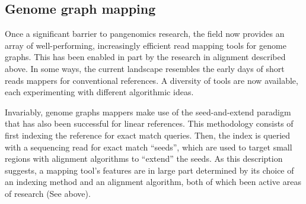 \subsection{Genome graph mapping}
Once a significant barrier to pangenomics research, the field now provides an array of well-performing, increasingly efficient read mapping tools for genome graphs.
This has been enabled in part by the research in alignment described above.
In some ways, the current landscape resembles the early days of short reads mappers for conventional references. 
A diversity of tools are now available, each experimenting with different algorithmic ideas. 


Invariably, genome graphs mappers make use of the seed-and-extend paradigm that has also been successful for linear references.
This methodology consists of first indexing the reference for exact match queries.
Then, the index is queried with a sequencing read for exact match ``seeds'', which are used to target small regions with alignment algorithms to ``extend'' the seeds. 
As this description suggests, a mapping tool's features are in large part determined by its choice of an indexing method and an alignment algorithm, both of which been active areas of research (See above).



